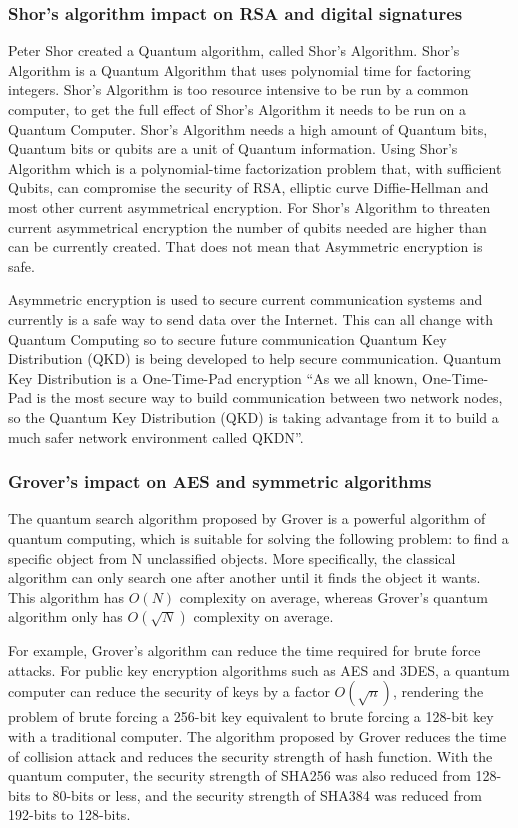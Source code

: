 \documentclass[sigconf]{acmart}
\begin{document}
\subsubsection{Shor's algorithm impact on RSA and digital signatures}
Peter Shor created a Quantum algorithm, called Shor’s Algorithm. Shor’s Algorithm is a Quantum Algorithm that uses polynomial time for factoring integers. Shor’s Algorithm is too resource intensive to be run by a common computer, to get the full effect of Shor’s Algorithm it needs to be run on a Quantum Computer. Shor’s Algorithm needs a high amount of Quantum bits, Quantum bits or qubits are a unit of Quantum information. Using Shor’s Algorithm which is a polynomial-time factorization problem that, with sufficient Qubits, can compromise the security of RSA, elliptic curve Diffie-Hellman and most other current asymmetrical encryption. For Shor’s Algorithm to threaten current asymmetrical encryption the number of qubits needed are higher than can be currently created. That does not mean that Asymmetric encryption is safe.\cite{shor_polynomial-time_1997}  
 
Asymmetric encryption is used to secure current communication systems and currently is a safe way to send data over the Internet. This can all change with Quantum Computing so to secure future communication Quantum Key Distribution (QKD) is being developed to help secure communication. Quantum Key Distribution is a One-Time-Pad encryption “As we all known, One-Time-Pad is the most secure way to build communication between two network nodes, so the Quantum Key Distribution (QKD) is taking advantage from it to build a much safer network environment called QKDN”\cite{liu_multi-path_2019}. 

\subsubsection{Grover's impact on AES and symmetric algorithms}
The quantum search algorithm proposed by Grover is a powerful algorithm of quantum computing, which is suitable for solving the following problem: to find a specific object from N unclassified objects. More specifically, the classical algorithm can only search one after another until it finds the object it wants. This algorithm has $O(N)$ complexity on average, whereas Grover's quantum algorithm only has $O(\sqrt{N})$ complexity on average\cite{canteaut_implementing_2020}.

For example, Grover’s algorithm can reduce the time required for brute force attacks. For public key encryption algorithms such as AES and 3DES, a quantum computer can reduce the security of keys by a factor $O(\sqrt{n})$, rendering the problem of brute forcing a 256-bit key equivalent to brute forcing a 128-bit key with a traditional computer. The algorithm proposed by Grover reduces the time of collision attack and reduces the security strength of hash function. With the quantum computer, the security strength of SHA256 was also reduced from 128-bits to 80-bits or less, and the security strength of SHA384 was reduced from 192-bits to 128-bits\cite{takagi_applying_2016}.
\end{document}

